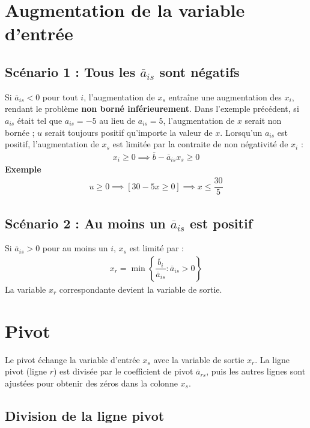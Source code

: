 \documentclass{report}
\begin{document}
\begin{multicols*}{2}
\section{Augmentation de la variable d'entrée}

\subsection{Scénario 1 : Tous les $\overline{a}_{is}$ sont négatifs}

Si $\overline{a}_{is} < 0$ pour tout $i$, l'augmentation de $x_s$ entraîne une augmentation
des $x_i$, rendant le problème \textbf{non borné inférieurement}. Dans l'exemple 
précédent, si $a_{is}$ était tel que $a_{is} = -5$ au lieu de $a_{is} = 5$, l'augmentation
de $x$ serait non bornée ; $u$ serait toujours positif qu'importe la valeur de $x$. 
Lorsqu'un $a_{is}$ est positif, l'augmentation de $x_s$ est limitée par 
la contraite de non négativité de $x_i$ :
\begin{align*}
    x_i \geq 0 \implies \overline{b} - \overline{a}_{is}x_s \geq 0
\end{align*}
\noindent
\textbf{Exemple}
\begin{align*}
    u \geq 0 \implies \left[ 30 - 5x \geq 0 \right] \implies x \leq \dfrac{30}{5}
\end{align*}

\subsection{Scénario 2 : Au moins un $\overline{a}_{is}$ est positif}

Si $\overline{a}_{is} > 0$ pour au moins un $i$, $x_s$ est limité par :
\begin{align*}
    x_r = \min\left\{ \dfrac{\overline{b}_i}{\overline{a}_{is}} :
    \overline{a}_{is} > 0 \right\}
\end{align*}
La variable $x_r$ correspondante devient la variable de sortie.

\section{Pivot}

Le pivot échange la variable d'entrée $x_s$ avec la variable de sortie $x_r$. La ligne pivot
(ligne $r$) est divisée par le coefficient de pivot $\overline{a}_{rs}$, puis les autres
lignes sont ajustées pour obtenir des zéros dans la colonne $x_s$.

\subsection{Division de la ligne pivot}


\end{multicols*}
\end{document}
